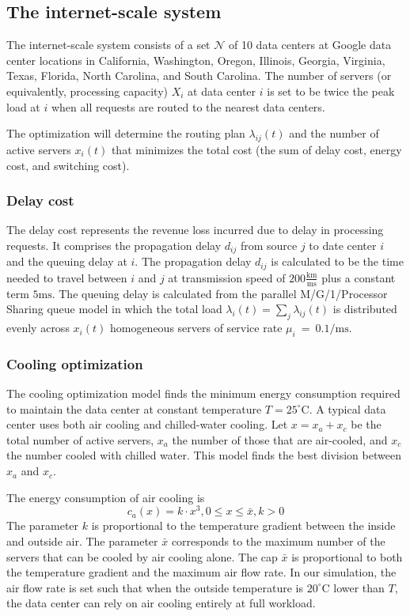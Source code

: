 \documentclass{acm_proc_article-sp}
\begin{document}
\subsection{The internet-scale system}
The internet-scale system consists of a set $\mathcal{N}$ of 10 data centers at Google data center locations in California, Washington, Oregon, Illinois, Georgia, Virginia, Texas, Florida, North Carolina, and South Carolina. The number of servers (or equivalently, processing capacity) $X_i$ at data center $i$ is set to be twice the peak load at $i$ when all requests are routed to the nearest data centers.

The optimization will determine the routing plan $\lambda_{ij}(t)$ and the number of active servers $x_i(t)$ that minimizes the total cost (the sum of delay cost, energy cost, and switching cost).

\subsubsection{Delay cost}
The delay cost represents the revenue loss incurred due to delay in processing requests. It comprises the propagation delay $d_{ij}$ from source $j$ to date center $i$ and the queuing delay at $i$.
The propagation delay $d_{ij}$ is calculated to be the time needed to travel between $i$ and $j$ at transmission speed of $200 \frac{\mathrm{km}}{\mathrm{ms}}$ plus a constant term $5 \mathrm{ms}$. The queuing delay is calculated from the parallel M/G/1/Processor Sharing queue model in which the total load $\lambda_i(t)=\sum_j \lambda_{ij}(t)$ is distributed evenly across $x_i(t)$ homogeneous servers of service rate \mbox{$\mu_i$ = $0.1 / \mathrm{ms}$}.

\subsubsection{Cooling optimization}
The cooling optimization model finds the minimum energy consumption required to maintain the data center at constant temperature $T = 25^{\circ}\textrm{C}$. A typical data center uses both air cooling and chilled-water cooling. Let $x = x_a + x_c$ be the total number of active servers, $x_a$ the number of those that are air-cooled, and $x_c$ the number cooled with chilled water. This model finds the best division between $x_a$ and $x_c$.

The energy consumption of air cooling is
\begin{equation}
c_a(x) = k \cdot x^3, 0 \leq x \leq \bar{x}, k > 0
\end{equation}
The parameter $k$ is proportional to the temperature gradient between the inside and outside air. The parameter $\bar{x}$ corresponds to the maximum number of the servers that can be cooled by air cooling alone. The cap $\bar{x}$ is proportional to both the temperature gradient and the maximum air flow rate. In our simulation, the air flow rate is set such that when the outside temperature is $20^{\circ}\mathrm{C}$ lower than $T$, the data center can rely on air cooling entirely at full workload.
\end{document}
